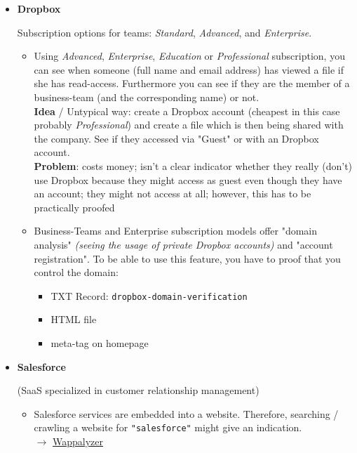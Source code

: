 \documentclass[12pt]{article}
\begin{document}
\begin{itemize}
    
    \item \textbf{Dropbox}
    
    Subscription options for teams: \textit{Standard}, \textit{Advanced}, and \textit{Enterprise}.
    
    \begin{itemize}
        \item Using \textit{Advanced}, \textit{Enterprise}, \textit{Education} or \textit{Professional} subscription, you can see when someone (full name and email address) has viewed a file if she has read-access. Furthermore you can see if they are the member of a business-team (and the corresponding name) or not. \\
        \textbf{Idea} / Untypical way: create a Dropbox account (cheapest in this case probably \textit{Professional}) and create a file which is then being shared with the company. See if they accessed via "Guest" or with an Dropbox account. \\
        \textbf{Problem}: costs money; isn't a clear indicator whether they really (don't) use Dropbox because they might access as guest even though they have an account; they might not access at all; however, this has to be practically proofed
        
        \item Business-Teams and Enterprise subscription models offer "domain analysis" \textit{(seeing the usage of private Dropbox accounts)} and "account registration". To be able to use this feature, you have to proof that you control the domain:
        \begin{itemize}
            \item TXT Record: \verb|dropbox-domain-verification|
            \item HTML file
            \item meta-tag on homepage
        \end{itemize}
    \end{itemize}
    
    
    \item \textbf{Salesforce}
    
    (SaaS specialized in customer relationship management)
    
    \begin{itemize}
        \item Salesforce services are embedded into a website. Therefore, searching / crawling a website for \verb|"salesforce"| might give an indication. \\
        $\rightarrow$ \href{https://www.wappalyzer.com/lists/?technologies=salesforce}{Wappalyzer}
        

\end{itemize}
\end{itemize}
\end{document}

